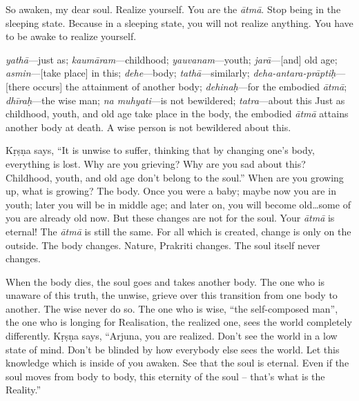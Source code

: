 So awaken, my dear soul. Realize yourself. You are the \textit{ātmā}. Stop being in the sleeping state. Because in a sleeping state, you will not realize anything. You have to be awake to realize yourself.

{%
  \textit{yathā}---just as; 
  \textit{kaumāram}---childhood; 
  \textit{yauvanam}---youth; 
  \textit{jarā}---[and] old age; 
  \textit{asmin}---[take place] in this; 
  \textit{dehe}---body; 
  \textit{tathā}---similarly; 
  \textit{deha-antara-prāptiḥ}---[there occurs] the attainment of another body; 
  \textit{dehinaḥ}---for the embodied \textit{ātmā}; 
  \textit{dhīraḥ}---the wise man; 
  \textit{na muhyati}---is not bewildered; 
  \textit{tatra}---about this
}
{%
  Just as childhood, youth, and old age take place in the body, the embodied \textit{ātmā} attains another body at death. A wise person is not bewildered about this.
}

Kṛṣṇa says, “It is unwise to suffer, thinking that by changing one’s body, everything is lost. Why are you grieving? Why are you sad about this? Childhood, youth, and old age don’t belong to the soul.” When are you growing up, what is growing? The body. Once you were a baby; maybe now you are in youth; later you will be in middle age; and later on, you will become old…some of you are already old now. But these changes are not for the soul. Your \textit{ātmā} is eternal! The \textit{ātmā} is still the same. For all which is created, change is only on the outside. The body changes. Nature, Prakriti changes. The soul itself never changes.

When the body dies, the soul goes and takes another body. The one who is unaware of this truth, the unwise, grieve over this transition from one body to another. The wise never do so. The one who is wise, “the self-composed man”, the one who is longing for Realisation, the realized one, sees the world completely differently. Kṛṣṇa says, “Arjuna, you are realized. Don’t see the world in a low state of mind. Don’t be blinded by how everybody else sees the world. Let this knowledge which is inside of you awaken. See that the soul is eternal. Even if the soul moves from body to body, this eternity of the soul – that’s what is the Reality.”

